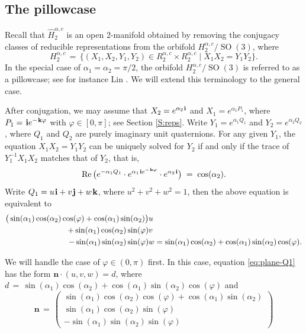 \documentclass[11pt,reqno]{amsart}
\theoremstyle{definition}
\renewcommand{\phi}{\varphi}
\renewcommand{\i}{\mspace{1.5mu}\mathbf i}
\renewcommand{\j}{\mspace{1.5mu}\mathbf j}
\renewcommand{\k}{\mspace{1.5mu}\mathbf k}
\newcommand{\n}{\mathbf n}
\renewcommand{\Re}{\operatorname{Re}}
\newcommand{\SO}{\operatorname{SO}}
\begin{document}
\begin{sloppypar}

\subsection{The pillowcase}
Recall that $\widehat{H}_2^{\alpha, c}$ is an open 2-manifold obtained by removing the conjugacy classes of reducible representations from the orbifold $H_2^{\alpha, c}/\SO(3)$, where
\[
H_2^{\alpha, c}\, =\, \big\lbrace(X_1, X_2, Y_1, Y_2)\in R_2^{\alpha, c} \times R_2^{\alpha, c} \; \big| \; X_1 X_2 = Y_1 Y_2 \big\rbrace.
\]
In the special case of $\alpha_1 = \alpha_2 = \pi/2$, the orbifold $H_2^{\alpha, c}/\SO(3)$ is referred to as a pillowcase; see for instance Lin \cite{Lin}. We will extend this terminology to the general case. 

After conjugation, we may assume that $X_2 = e^{\alpha_2 \i}$ and $X_1 = e^{\alpha_1 P_1}$, where $P_1 = \i e^{- \k \phi}$ with $\phi \in [0, \pi]$; see Section \ref{S:reps}. Write $Y_1 = e^{\alpha_1 Q_1}$ and $Y_2 = e^{\alpha_2 Q_2}$, where $Q_1$ and $Q_2$ are purely imaginary unit quaternions. For any given $Y_1$, the equation $X_1 X_2 = Y_1 Y_2$ can be uniquely solved for $Y_2$ if and only if the trace of $Y_1^{- 1} X_1 X_2$ matches that of $Y_2$, that is,
\[
\Re \big(e^{- \alpha_1 Q_1}\cdot e^{\alpha_1 \i e^{- \k \phi}} \cdot e^{\alpha_2 \i}\big)\; =\; \cos (\alpha_2).
\]
Write $Q_1 = u \i + v \j + w \k$, where $u^2 + v^2 + w^2 = 1$, then the above equation is equivalent to
\begin{align}
\big( \sin(\alpha_1) \cos(\alpha_2) \cos(\phi) + \cos(\alpha_1) \sin(\alpha_2) \big) & u \label{eq:plane-Q1}  \\
+ \sin(\alpha_1) \cos(\alpha_2) \sin(\phi) & v \notag \\
-  \sin(\alpha_1) \sin(\alpha_2) \sin(\phi) & w = \sin(\alpha_1) \cos(\alpha_2) + \cos(\alpha_1) \sin(\alpha_2) \cos(\phi).\notag
\end{align}

We will handle the case of $\phi \in (0, \pi)$ first. In this case, equation \eqref{eq:plane-Q1} has the form $\n \cdot (u, v, w) = d$, where $d\, =\, \sin(\alpha_1) \cos(\alpha_2) + \cos(\alpha_1) \sin(\alpha_2) \cos(\phi)$ and
\medskip
\[
\n\, =\, \begin{pmatrix}
\sin(\alpha_1) \cos(\alpha_2) \cos(\phi) + \cos(\alpha_1) \sin(\alpha_2) \\
\sin(\alpha_1) \cos(\alpha_2) \sin(\phi) \\
- \sin(\alpha_1) \sin(\alpha_2) \sin(\phi)\quad
\end{pmatrix}
\] 


\end{sloppypar}
\end{document}
